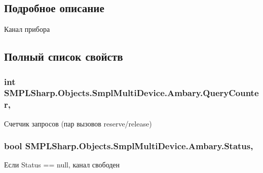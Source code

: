 \subsection{Подробное описание}
Канал прибора 



\subsection{Полный список свойств}
\hypertarget{struct_s_m_p_l_sharp_1_1_objects_1_1_smpl_multi_device_1_1_ambary_a12e73f17080970b2bbc38c3ac17ae550}{
\subsubsection[{Query\-Counter}]{\setlength{\rightskip}{0pt plus 5cm}int S\-M\-P\-L\-Sharp.\-Objects.\-Smpl\-Multi\-Device.\-Ambary.\-Query\-Counter\hspace{0.3cm}{\ttfamily [get]}, {\ttfamily [set]}}}\label{d1/df4/struct_s_m_p_l_sharp_1_1_objects_1_1_smpl_multi_device_1_1_ambary_a12e73f17080970b2bbc38c3ac17ae550}


Счетчик запросов (пар вызовов reserve/release) 

\hypertarget{struct_s_m_p_l_sharp_1_1_objects_1_1_smpl_multi_device_1_1_ambary_ae9cea4ed6bb76111ae7d714c27e2499f}{
\subsubsection[{Status}]{\setlength{\rightskip}{0pt plus 5cm}bool S\-M\-P\-L\-Sharp.\-Objects.\-Smpl\-Multi\-Device.\-Ambary.\-Status\hspace{0.3cm}{\ttfamily [get]}, {\ttfamily [set]}}}\label{d1/df4/struct_s_m_p_l_sharp_1_1_objects_1_1_smpl_multi_device_1_1_ambary_ae9cea4ed6bb76111ae7d714c27e2499f}


Если Status == null, канал свободен 

